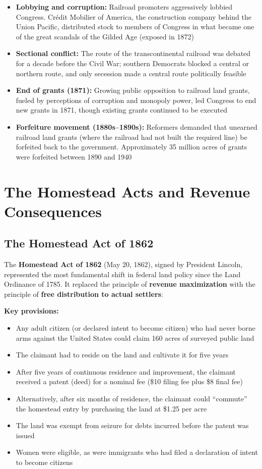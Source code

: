 \documentclass[12pt]{article}
\begin{document}
\begin{itemize}
\item \textbf{Lobbying and corruption:} Railroad promoters aggressively lobbied Congress.  Cr\'edit Mobilier of America, the construction company behind the Union Pacific, distributed stock to members of Congress in what became one of the great scandals of the Gilded Age (exposed in 1872)
\item \textbf{Sectional conflict:} The route of the transcontinental railroad was debated for a decade before the Civil War; southern Democrats blocked a central or northern route, and only secession made a central route politically feasible
\item \textbf{End of grants (1871):} Growing public opposition to railroad land grants, fueled by perceptions of corruption and monopoly power, led Congress to end new grants in 1871, though existing grants continued to be executed
\item \textbf{Forfeiture movement (1880s--1890s):} Reformers demanded that unearned railroad land grants (where the railroad had not built the required line) be forfeited back to the government.  Approximately 35 million acres of grants were forfeited between 1890 and 1940
\end{itemize}


\section{The Homestead Acts and Revenue Consequences}\label{sec:homestead}

\subsection{The Homestead Act of 1862}

The \textbf{Homestead Act of 1862} (May 20, 1862), signed by President Lincoln, represented the most fundamental shift in federal land policy since the Land Ordinance of 1785.  It replaced the principle of \textbf{revenue maximization} with the principle of \textbf{free distribution to actual settlers}:

\textbf{Key provisions:}
\begin{itemize}
\item Any adult citizen (or declared intent to become citizen) who had never borne arms against the United States could claim 160 acres of surveyed public land
\item The claimant had to reside on the land and cultivate it for five years
\item After five years of continuous residence and improvement, the claimant received a patent (deed) for a nominal fee (\$10 filing fee plus \$8 final fee)
\item Alternatively, after six months of residence, the claimant could ``commute'' the homestead entry by purchasing the land at \$1.25 per acre
\item The land was exempt from seizure for debts incurred before the patent was issued
\item Women were eligible, as were immigrants who had filed a declaration of intent to become citizens
\end{itemize}
\end{document}
